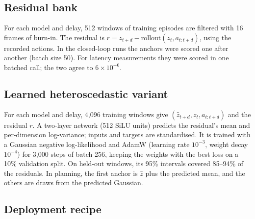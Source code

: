 \documentclass[aps,physrev,\manuscriptlayout,superscriptaddress,
  longbibliography,amsmath,amssymb]{revtex4-2}
\begin{document}
\subsection{Residual bank}\label{sec:bank}

For each model and delay, 512 windows of training episodes are filtered with 16 frames of burn-in. The residual is $r=z_{t+d}-\mathrm{rollout}(z_t,a_{t:t+d})$, using the recorded actions. In the closed-loop runs the anchors were scored one after another (batch size 50). For latency measurements they were scored in one batched call; the two agree to $6\times10^{-6}$.

\subsection{Learned heteroscedastic variant}\label{sec:learned}

For each model and delay, 4,096 training windows give $(\hat z_{t+d}, z_t, a_{t:t+d})$ and the residual $r$. A two-layer network (512 SiLU units) predicts the residual's mean and per-dimension log-variance; inputs and targets are standardised. It is trained with a Gaussian negative log-likelihood and AdamW (learning rate $10^{-3}$, weight decay $10^{-4}$) for 3,000 steps of batch 256, keeping the weights with the best loss on a 10\% validation split. On held-out windows, its 95\% intervals covered 85--94\% of the residuals. In planning, the first anchor is $\hat z$ plus the predicted mean, and the others are draws from the predicted Gaussian.

\subsection{Deployment recipe}\label{sec:recipe}
\end{document}

